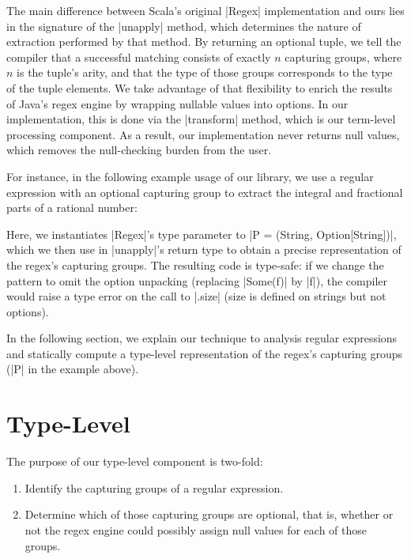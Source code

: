 The main difference between Scala's original |Regex| implementation and ours lies in the signature of the |unapply| method, which determines the nature of extraction performed by that method.
By returning an optional tuple, we tell the compiler that a successful matching consists of exactly $n$ capturing groups, where $n$ is the tuple's arity, and that the type of those groups corresponds to the type of the tuple elements.
We take advantage of that flexibility to enrich the results of Java's regex engine by wrapping nullable values into options.
In our implementation, this is done via the |transform| method, which is our
term-level processing component.
As a result, our implementation never returns null values, which removes the null-checking burden from the user.

For instance, in the following example usage of our library, we use a regular expression with an optional capturing group to extract the integral and fractional parts of a rational number:

\regexRational

\noindent
Here, we instantiates |Regex|'s type parameter to |P = (String, Option[String])|, which we then use in |unapply|'s return type to obtain a precise representation of the regex's capturing groups.
The resulting code is type-safe: if we change the pattern to omit the option unpacking (replacing |Some(f)| by |f|), the compiler would raise a type error on the call to |.size| (size is defined on strings but not options).

In the following section, we explain our technique to analysis regular expressions and statically compute a type-level representation of the regex's capturing groups (|P| in the example above).

\section{Type-Level}
\label{sec:type-level}

The purpose of our type-level component is two-fold:

\begin{enumerate}
  \item Identify the capturing groups of a regular expression.
  \item Determine which of those capturing groups are optional, that is, whether or not the regex engine could possibly assign null values for each of those groups.
\end{enumerate}


